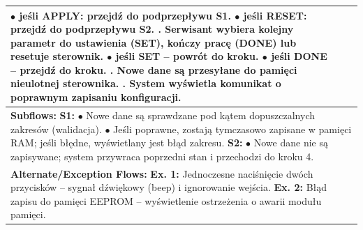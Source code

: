 \documentclass[12pt,a4paper]{article}
\begin{document}
\begin{table}[h!]
\begin{tabular}{|p{}|p{}|p{}|}
{\hspace*{10pt} $\bullet$ jeśli APPLY: przejdź do podprzepływu S1. \newline
\hspace*{10pt} $\bullet$ jeśli RESET: przejdź do podprzepływu S2. \newline
4. Serwisant wybiera kolejny parametr do ustawienia (SET), kończy pracę (DONE) lub resetuje sterownik. \newline
\hspace*{10pt} $\bullet$ jeśli SET – powrót do kroku. \newline
\hspace*{10pt} $\bullet$ jeśli DONE – przejdź do kroku. \newline
5. Nowe dane są przesyłane do pamięci nieulotnej sterownika. \newline
6. System wyświetla komunikat o poprawnym zapisaniu konfiguracji.} \\ \hline
\multicolumn{3}{|p{0.9\textwidth}|}{\textbf{Subflows:} \newline
\textbf{S1:} \newline
\hspace*{10pt} $\bullet$ Nowe dane są sprawdzane pod kątem dopuszczalnych zakresów (walidacja). \newline
\hspace*{10pt} $\bullet$ Jeśli poprawne, zostają tymczasowo zapisane w pamięci RAM; jeśli błędne, wyświetlany jest błąd zakresu. \newline
\textbf{S2:} \newline
\hspace*{10pt} $\bullet$ Nowe dane nie są zapisywane; system przywraca poprzedni stan i przechodzi do kroku 4.} \\ \hline
\multicolumn{3}{|p{0.9\textwidth}|}{\textbf{Alternate/Exception Flows:} \newline
\textbf{Ex. 1:} Jednoczesne naciśnięcie dwóch przycisków – sygnał dźwiękowy (beep) i ignorowanie wejścia. \newline
\textbf{Ex. 2:} Błąd zapisu do pamięci EEPROM – wyświetlenie ostrzeżenia o awarii modułu pamięci.} \\ \hline
\end{tabular}
\end{table}
\end{document}
